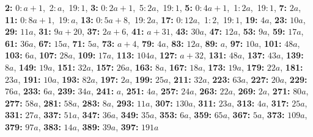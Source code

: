 \textsf{\bfseries 2:} 0:\,$a + 1$,\ 2:\,$a$,\ 19:\,$1$, \textsf{\bfseries 3:} 0:\,$2a + 1$,\ 5:\,$2a$,\ 19:\,$1$, \textsf{\bfseries 5:} 0:\,$4a + 1$,\ 1:\,$2a$,\ 19:\,$1$, \textsf{\bfseries 7:} $2a$, \textsf{\bfseries 11:} 0:\,$8a + 1$,\ 19:\,$a$, \textsf{\bfseries 13:} 0:\,$5a + 8$,\ 19:\,$2a$, \textsf{\bfseries 17:} 0:\,$12a$,\ 1:\,$2$,\ 19:\,$1$, \textsf{\bfseries 19:} $4a$, \textsf{\bfseries 23:} $10a$, \textsf{\bfseries 29:} $11a$, \textsf{\bfseries 31:} $9a + 20$, \textsf{\bfseries 37:} $2a + 6$, \textsf{\bfseries 41:} $a + 31$, \textsf{\bfseries 43:} $30a$, \textsf{\bfseries 47:} $12a$, \textsf{\bfseries 53:} $9a$, \textsf{\bfseries 59:} $17a$, \textsf{\bfseries 61:} $36a$, \textsf{\bfseries 67:} $15a$, \textsf{\bfseries 71:} $5a$, \textsf{\bfseries 73:} $a + 4$, \textsf{\bfseries 79:} $4a$, \textsf{\bfseries 83:} $12a$, \textsf{\bfseries 89:} $a$, \textsf{\bfseries 97:} $10a$, \textsf{\bfseries 101:} $48a$, \textsf{\bfseries 103:} $6a$, \textsf{\bfseries 107:} $28a$, \textsf{\bfseries 109:} $17a$, \textsf{\bfseries 113:} $104a$, \textsf{\bfseries 127:} $a + 32$, \textsf{\bfseries 131:} $48a$, \textsf{\bfseries 137:} $43a$, \textsf{\bfseries 139:} $8a$, \textsf{\bfseries 149:} $19a$, \textsf{\bfseries 151:} $32a$, \textsf{\bfseries 157:} $26a$, \textsf{\bfseries 163:} $8a$, \textsf{\bfseries 167:} $18a$, \textsf{\bfseries 173:} $19a$, \textsf{\bfseries 179:} $22a$, \textsf{\bfseries 181:} $23a$, \textsf{\bfseries 191:} $10a$, \textsf{\bfseries 193:} $82a$, \textsf{\bfseries 197:} $2a$, \textsf{\bfseries 199:} $25a$, \textsf{\bfseries 211:} $32a$, \textsf{\bfseries 223:} $63a$, \textsf{\bfseries 227:} $20a$, \textsf{\bfseries 229:} $76a$, \textsf{\bfseries 233:} $6a$, \textsf{\bfseries 239:} $34a$, \textsf{\bfseries 241:} $a$, \textsf{\bfseries 251:} $4a$, \textsf{\bfseries 257:} $24a$, \textsf{\bfseries 263:} $22a$, \textsf{\bfseries 269:} $2a$, \textsf{\bfseries 271:} $80a$, \textsf{\bfseries 277:} $58a$, \textsf{\bfseries 281:} $58a$, \textsf{\bfseries 283:} $8a$, \textsf{\bfseries 293:} $11a$, \textsf{\bfseries 307:} $130a$, \textsf{\bfseries 311:} $23a$, \textsf{\bfseries 313:} $4a$, \textsf{\bfseries 317:} $25a$, \textsf{\bfseries 331:} $27a$, \textsf{\bfseries 337:} $51a$, \textsf{\bfseries 347:} $36a$, \textsf{\bfseries 349:} $35a$, \textsf{\bfseries 353:} $6a$, \textsf{\bfseries 359:} $65a$, \textsf{\bfseries 367:} $5a$, \textsf{\bfseries 373:} $109a$, \textsf{\bfseries 379:} $97a$, \textsf{\bfseries 383:} $14a$, \textsf{\bfseries 389:} $39a$, \textsf{\bfseries 397:} $191a$